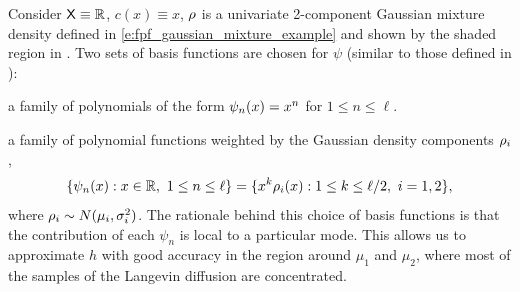 Consider ${\sf X} \equiv \mathbb{R}$, $c(x) \equiv x $, $\rho$ is a univariate 2-component Gaussian mixture density defined in \eqref{e:fpf_gaussian_mixture_example} and shown by the shaded region in . Two sets of basis functions are chosen for $\psi$ (similar to those defined in ):
\begin{romannum}
	\item  a family of polynomials of the form $\psi_n(x) = x^n$ for $1 \leq n \leq \ell$.
	\item a family of polynomial functions weighted by the Gaussian density components $\rho_i$,
	\begin{equation}
	\{\psi_n(x) : x\in\Re,\ 1\le n\le \ell\}  = \{ x^k \pr_i(x) :  1\le k \le \ell/2,   \ i=1,2\},
	\label{e:basis}
	\end{equation}
	where $\rho_i \sim N(\mu_i, \sigma^2_i)$. The rationale behind this choice of basis functions is that the contribution of each $\psi_n$ is local to a particular mode.  This allows us to approximate $h$ with good accuracy in the region around $\mu_1$ and $\mu_2$, where most of the samples of the Langevin diffusion are concentrated. 
\end{romannum}

